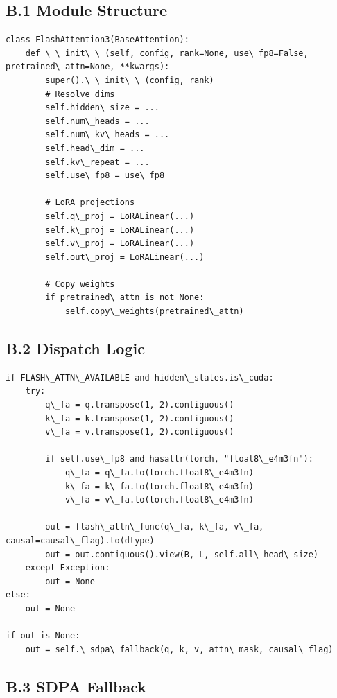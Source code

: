 \subsection{B.1 Module Structure}

\begin{lstlisting}
class FlashAttention3(BaseAttention):
    def \_\_init\_\_(self, config, rank=None, use\_fp8=False, pretrained\_attn=None, **kwargs):
        super().\_\_init\_\_(config, rank)
        # Resolve dims
        self.hidden\_size = ...
        self.num\_heads = ...
        self.num\_kv\_heads = ...
        self.head\_dim = ...
        self.kv\_repeat = ...
        self.use\_fp8 = use\_fp8
        
        # LoRA projections
        self.q\_proj = LoRALinear(...)
        self.k\_proj = LoRALinear(...)
        self.v\_proj = LoRALinear(...)
        self.out\_proj = LoRALinear(...)
        
        # Copy weights
        if pretrained\_attn is not None:
            self.copy\_weights(pretrained\_attn)
\end{lstlisting}

\subsection{B.2 Dispatch Logic}

\begin{lstlisting}
if FLASH\_ATTN\_AVAILABLE and hidden\_states.is\_cuda:
    try:
        q\_fa = q.transpose(1, 2).contiguous()
        k\_fa = k.transpose(1, 2).contiguous()
        v\_fa = v.transpose(1, 2).contiguous()
        
        if self.use\_fp8 and hasattr(torch, "float8\_e4m3fn"):
            q\_fa = q\_fa.to(torch.float8\_e4m3fn)
            k\_fa = k\_fa.to(torch.float8\_e4m3fn)
            v\_fa = v\_fa.to(torch.float8\_e4m3fn)
        
        out = flash\_attn\_func(q\_fa, k\_fa, v\_fa, causal=causal\_flag).to(dtype)
        out = out.contiguous().view(B, L, self.all\_head\_size)
    except Exception:
        out = None
else:
    out = None

if out is None:
    out = self.\_sdpa\_fallback(q, k, v, attn\_mask, causal\_flag)
\end{lstlisting}

\subsection{B.3 SDPA Fallback}

